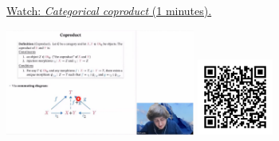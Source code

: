 
\begin{minipage}{10cm}
    \href{https://act4e-spring21.netlify.app/videos/spring2021-coproducts:coproducts:cat-prod.html}{Watch: \emph{Categorical coproduct} (1 minutes).}
        
    \href{https://act4e-spring21.netlify.app/videos/spring2021-coproducts:coproducts:cat-prod.html}{\includegraphics[height=3.5cm]{spring2021-coproducts:coproducts:cat-prod/thumbnails.jpg}}
    \href{https://act4e-spring21.netlify.app/videos/spring2021-coproducts:coproducts:cat-prod.html}{\includegraphics[height=2.5cm]{spring2021-coproducts:coproducts:cat-prod/qrcode.png}}
\end{minipage}

